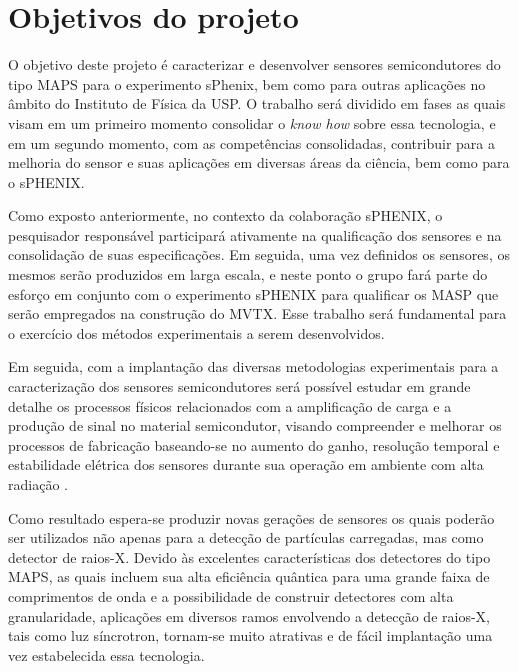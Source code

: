 \chapter{Objetivos do projeto}

O objetivo deste projeto é caracterizar e desenvolver sensores semicondutores do tipo MAPS para o experimento sPhenix, bem como para outras aplicações no âmbito do Instituto de Física da USP. O trabalho será dividido em fases as quais visam em um primeiro momento consolidar o {\it know how} sobre essa tecnologia, e em um segundo momento, com as competências consolidadas, contribuir para a melhoria do sensor e suas aplicações em diversas áreas da ciência, bem como para o sPHENIX.

Como exposto anteriormente, no contexto da colaboração sPHENIX, o pesquisador responsável participará ativamente na qualificação dos sensores e na consolidação de suas especificações. Em seguida, uma vez definidos os sensores, os mesmos serão produzidos em larga escala, e neste ponto o grupo fará parte do esforço em conjunto com o experimento sPHENIX para qualificar os MASP que serão empregados na construção do MVTX. Esse trabalho será fundamental para o exercício dos métodos experimentais a serem desenvolvidos.

Em seguida, com a implantação das diversas metodologias experimentais para a caracterização dos sensores semicondutores será possível estudar em grande detalhe os processos físicos relacionados com a amplificação de carga e a produção de sinal no material semicondutor, visando compreender e melhorar os processos de fabricação baseando-se no aumento do ganho, resolução temporal e estabilidade elétrica dos sensores durante sua operação em ambiente com alta radiação \cite{}. 

Como resultado espera-se produzir novas gerações de sensores os quais poderão ser utilizados não apenas para a detecção de partículas carregadas, mas como detector de raios-X. Devido às excelentes características dos detectores do tipo MAPS, as quais incluem sua alta eficiência quântica para uma grande faixa de comprimentos de onda e a possibilidade de construir detectores com alta granularidade, aplicações em diversos ramos envolvendo a detecção de raios-X, tais como luz síncrotron, tornam-se muito atrativas e de fácil implantação uma vez estabelecida essa tecnologia.

